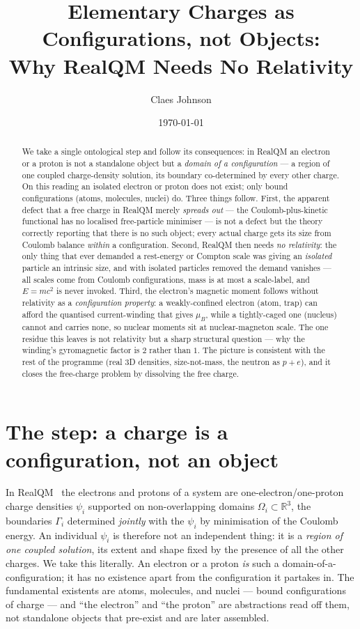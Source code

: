 \documentclass[11pt]{article}
\title{Elementary Charges as Configurations, not Objects:\\
Why RealQM Needs No Relativity}
\author[1]{Claes Johnson}
\affil[1]{KTH Royal Institute of Technology, SE-100 44 Stockholm, Sweden \\
\texttt{claesjohnson@gmail.com}}
\date{\today}
\begin{document}
\maketitle

\begin{abstract}
We take a single ontological step and follow its consequences: in RealQM an electron or a proton is not a
standalone object but a \emph{domain of a configuration} --- a region of one coupled charge-density
solution, its boundary co-determined by every other charge. On this reading an isolated electron or proton
does not exist; only bound configurations (atoms, molecules, nuclei) do. Three things follow. First, the
apparent defect that a free charge in RealQM merely \emph{spreads out} --- the Coulomb-plus-kinetic
functional has no localised free-particle minimiser --- is not a defect but the theory correctly reporting
that there is no such object; every actual charge gets its size from Coulomb balance \emph{within} a
configuration. Second, RealQM then needs \emph{no relativity}: the only thing that ever demanded a
rest-energy or Compton scale was giving an \emph{isolated} particle an intrinsic size, and with isolated
particles removed the demand vanishes --- all scales come from Coulomb configurations, mass is at most a
scale-label, and $E=mc^2$ is never invoked. Third, the electron's magnetic moment follows without
relativity as a \emph{configuration property}: a weakly-confined electron (atom, trap) can afford the
quantised current-winding that gives $\mu_B$, while a tightly-caged one (nucleus) cannot and carries none,
so nuclear moments sit at nuclear-magneton scale. The one residue this leaves is not relativity but a
sharp structural question --- why the winding's gyromagnetic factor is $2$ rather than $1$. The picture is
consistent with the rest of the programme (real 3D densities, size-not-mass, the neutron as $p+e$), and it
closes the free-charge problem by dissolving the free charge.
\end{abstract}


\section{The step: a charge is a configuration, not an object}
\label{sec:step}

In RealQM~\cite{RealQM} the electrons and protons of a system are one-electron/one-proton charge densities
$\psi_i$ supported on non-overlapping domains $\Omega_i\subset\mathbb R^3$, the boundaries $\Gamma_i$
determined \emph{jointly} with the $\psi_i$ by minimisation of the Coulomb energy. An individual
$\psi_i$ is therefore not an independent thing: it is a \emph{region of one coupled solution}, its extent
and shape fixed by the presence of all the other charges. We take this literally. An electron or a proton
\emph{is} such a domain-of-a-configuration; it has no existence apart from the configuration it partakes
in. The fundamental existents are atoms, molecules, and nuclei --- bound configurations of charge --- and
``the electron'' and ``the proton'' are abstractions read off them, not standalone objects that pre-exist
and are later assembled.
\end{document}
